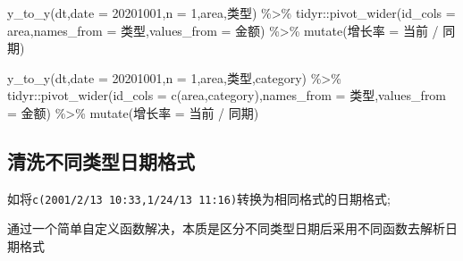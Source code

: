 \documentclass[
]{book}
\newenvironment{Shaded}{\begin{snugshade}}{\end{snugshade}}
\newcommand{\AttributeTok}[1]{\textcolor[rgb]{0.77,0.63,0.00}{#1}}
\newcommand{\DecValTok}[1]{\textcolor[rgb]{0.00,0.00,0.81}{#1}}
\newcommand{\FunctionTok}[1]{\textcolor[rgb]{0.00,0.00,0.00}{#1}}
\newcommand{\NormalTok}[1]{#1}
\newcommand{\OtherTok}[1]{\textcolor[rgb]{0.56,0.35,0.01}{#1}}
\newcommand{\SpecialCharTok}[1]{\textcolor[rgb]{0.00,0.00,0.00}{#1}}
\newcommand{\StringTok}[1]{\textcolor[rgb]{0.31,0.60,0.02}{#1}}
\begin{document}
\begin{Shaded}
\begin{Highlighting}[]
\FunctionTok{y\_to\_y}\NormalTok{(dt,}\AttributeTok{date =} \StringTok{\textquotesingle{}20201001\textquotesingle{}}\NormalTok{,}\AttributeTok{n =} \DecValTok{1}\NormalTok{,area,类型) }\SpecialCharTok{\%\textgreater{}\%} 
\NormalTok{  tidyr}\SpecialCharTok{::}\FunctionTok{pivot\_wider}\NormalTok{(}\AttributeTok{id\_cols =} \StringTok{\textquotesingle{}area\textquotesingle{}}\NormalTok{,}\AttributeTok{names\_from =} \StringTok{\textquotesingle{}类型\textquotesingle{}}\NormalTok{,}\AttributeTok{values\_from =} \StringTok{\textquotesingle{}金额\textquotesingle{}}\NormalTok{) }\SpecialCharTok{\%\textgreater{}\%} 
  \FunctionTok{mutate}\NormalTok{(增长率 }\OtherTok{=}\NormalTok{ 当前 }\SpecialCharTok{/}\NormalTok{ 同期)}

\FunctionTok{y\_to\_y}\NormalTok{(dt,}\AttributeTok{date =} \StringTok{\textquotesingle{}20201001\textquotesingle{}}\NormalTok{,}\AttributeTok{n =} \DecValTok{1}\NormalTok{,area,类型,category) }\SpecialCharTok{\%\textgreater{}\%} 
\NormalTok{  tidyr}\SpecialCharTok{::}\FunctionTok{pivot\_wider}\NormalTok{(}\AttributeTok{id\_cols =} \FunctionTok{c}\NormalTok{(}\StringTok{\textquotesingle{}area\textquotesingle{}}\NormalTok{,}\StringTok{\textquotesingle{}category\textquotesingle{}}\NormalTok{),}\AttributeTok{names\_from =} \StringTok{\textquotesingle{}类型\textquotesingle{}}\NormalTok{,}\AttributeTok{values\_from =} \StringTok{\textquotesingle{}金额\textquotesingle{}}\NormalTok{) }\SpecialCharTok{\%\textgreater{}\%} 
  \FunctionTok{mutate}\NormalTok{(增长率 }\OtherTok{=}\NormalTok{ 当前 }\SpecialCharTok{/}\NormalTok{ 同期)}
\end{Highlighting}
\end{Shaded}

\hypertarget{ux6e05ux6d17ux4e0dux540cux7c7bux578bux65e5ux671fux683cux5f0f}{%
\subsection{清洗不同类型日期格式}\label{ux6e05ux6d17ux4e0dux540cux7c7bux578bux65e5ux671fux683cux5f0f}}

如将\texttt{c(\textquotesingle{}2001/2/13\ 10:33\textquotesingle{},\textquotesingle{}1/24/13\ 11:16\textquotesingle{})}转换为相同格式的日期格式;

通过一个简单自定义函数解决，本质是区分不同类型日期后采用不同函数去解析日期格式
\end{document}
